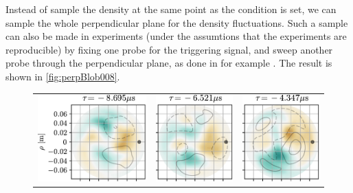 Instead of sample the density at the same point as the condition is set, we can sample the whole perpendicular plane for the density fluctuations.
Such a sample can also be made in experiments (under the assumtions that the experiments are reproducible) by fixing one probe for the triggering signal, and sweep another probe through the perpendicular plane, as done in for example \cite{Nielsen1996}.
The result is shown in \cref{fig:perpBlob008}.
%
\begin{figure}[h!]
\begin{tabular}{ccc}
  \includegraphics{fig/results/blobs/matrix-perp-blobs-B0_0.08-fluct/0} &
  \includegraphics{fig/results/blobs/matrix-perp-blobs-B0_0.08-fluct/1} &
  \includegraphics{fig/results/blobs/matrix-perp-blobs-B0_0.08-fluct/2} \\

\end{tabular}
\end{figure}
